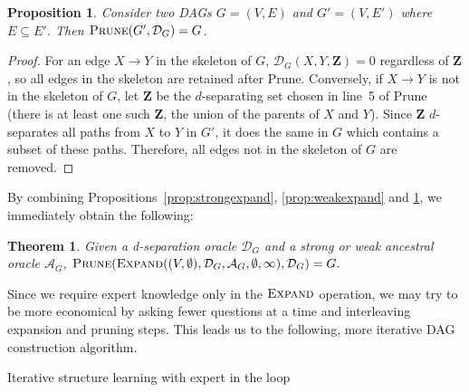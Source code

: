 \documentclass[accepted]{uai2025} %
\newtheorem{proposition}{Proposition}
\newtheorem{theorem}{Theorem}
\begin{document}
\begin{proposition}
Consider two DAGs $G=(V,E)$ and $G'=(V,E')$ where $E \subseteq E'$. 
Then $\textsc{Prune}(G',\mathcal{D}_G)=G$.
\label{prop:prune}
\end{proposition}

\begin{proof}
For an edge $X \to Y$ in the skeleton of $G$, 
$\mathcal{D}_G(X, Y, \mathbf{Z}) = 0$ regardless 
of $\mathbf{Z}$, so all edges in the skeleton are 
retained after {\sc Prune}. Conversely, if 
 $X \to Y$ is not in the skeleton of $G$, let 
$\mathbf{Z}$ be the $d$-separating set chosen 
in line~5 of {\sc Prune} (there is at least one 
such $\mathbf{Z}$, the union of the parents of 
$X$ and $Y$). Since  $\mathbf{Z}$ $d$-separates 
all paths from $X$ to $Y$ in $G'$, it does the same 
in $G$ which contains a subset of these paths. 
Therefore, all edges not in the skeleton of $G$ are 
removed.
\end{proof}

By combining Propositions~\ref{prop:strongexpand}, \ref{prop:weakexpand} and 
\ref{prop:prune}, we immediately obtain the following:

\begin{theorem}
Given a d-separation oracle $\mathcal{D}_G$ and a strong or weak 
ancestral oracle $\mathcal{A}_G$, 
$\textsc{Prune}(\textsc{Expand}((V,\emptyset),\mathcal{D}_G,\mathcal{A}_G,\emptyset,\infty),\mathcal{D}_G)=G.$
\end{theorem}

Since we require expert knowledge only in the $\textsc{Expand}$ 
operation, we may try to be more economical by asking fewer 
questions at a time and interleaving expansion and
pruning steps. This leads us to the following, more iterative 
DAG construction algorithm.

\begin{algorithm}[h]
\DontPrintSemicolon
\SetAlgoLined
{}


\caption{Iterative structure learning with expert in the loop}
\label{algo:expert}
\end{algorithm} 
\end{document}
